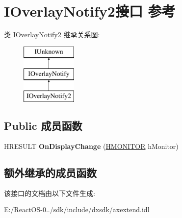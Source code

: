 \hypertarget{interface_i_overlay_notify2}{}\section{I\+Overlay\+Notify2接口 参考}
\label{interface_i_overlay_notify2}
类 I\+Overlay\+Notify2 继承关系图\+:\begin{figure}[H]
\begin{center}
\leavevmode
\includegraphics[height=3.000000cm]{interface_i_overlay_notify2}
\end{center}
\end{figure}
\subsection*{Public 成员函数}
\begin{DoxyCompactItemize}
\item 
\mbox{\label{interface_i_overlay_notify2_aba732b653fdd50f782d6d2e63c05ead4}} 
H\+R\+E\+S\+U\+LT {\bfseries On\+Display\+Change} (\hyperlink{interfacevoid}{H\+M\+O\+N\+I\+T\+OR} h\+Monitor)
\end{DoxyCompactItemize}
\subsection*{额外继承的成员函数}


该接口的文档由以下文件生成\+:\begin{DoxyCompactItemize}
\item 
E\+:/\+React\+O\+S-\/0../sdk/include/dxsdk/axextend.\+idl\end{DoxyCompactItemize}
